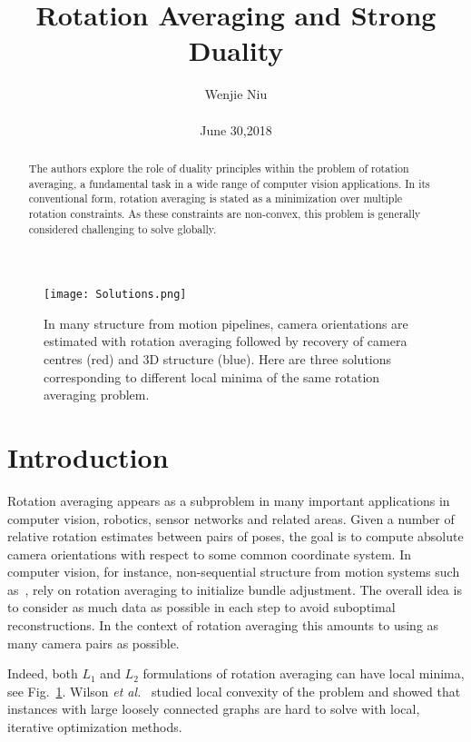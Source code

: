 \documentclass[10pt,twocolumn,letterpaper]{article}
\begin{document}
\title{Rotation Averaging and Strong Duality}

\author{Wenjie Niu\\\\ June 30,2018}

\maketitle

\begin{abstract}
The authors explore the role of duality principles
within the problem of rotation averaging, a fundamental
task in a wide range of computer vision applications. In its conventional form, rotation averaging is stated as a minimization over multiple rotation constraints. As these constraints are non-convex, this problem is generally considered challenging to solve globally.\par
\end{abstract}

\begin{figure}[!htp]
\begin{center}
   \texttt{[image: Solutions.png]}
\end{center}
   \caption{In many structure from motion pipelines, camera
orientations are estimated with rotation averaging followed
by recovery of camera centres (red) and 3D structure
(blue). Here are three solutions corresponding to different
local minima of the same rotation averaging problem.\cite{Eriksson_2018_CVPR}}
\label{fig:Solutions}
\end{figure}

\section{Introduction}
Rotation averaging appears as a subproblem in many
important applications in computer vision, robotics, sensor
networks and related areas. Given a number of relative
rotation estimates between pairs of poses, the goal is to
compute absolute camera orientations with respect to some
common coordinate system. In computer vision, for instance,
non-sequential structure from motion systems such
as~\cite{Martinec2007Robust},\cite{Enqvist2011Non} rely on rotation averaging to initialize bundle
adjustment. The overall idea is to consider as much data as
possible in each step to avoid suboptimal reconstructions.
In the context of rotation averaging this amounts to using as
many camera pairs as possible.\par
Indeed, both $L_1$ and $L_2$ formulations of rotation averaging
can have local minima, see Fig.~\ref{fig:Solutions}. Wilson \emph{et al.}~\cite{Wilson_2016_wh} studied
local convexity of the problem and showed that instances
with large loosely connected graphs are hard to solve with
local, iterative optimization methods.\par


{\small


}
\end{document}
